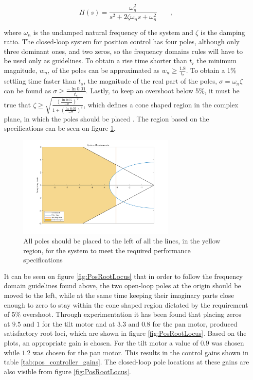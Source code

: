\documentclass[../../main.tex]{subfiles}
\begin{document}
\begin{equation} \label{eq:basic_second_order_tf}
    H(s) = \frac{\omega_n^2}{s^2 + 2\zeta \omega_n s + \omega_n^2} \qquad ,
\end{equation}

where $\omega_{n}$ is the undamped natural frequency of the system and $\zeta$ is the damping ratio. 
The closed-loop system for position control has four poles, although only three dominant ones, and two zeros, so the frequency domains rules will have to be used only as guidelines. To obtain a rise time shorter than $t_r$ the minimum magnitude, $w_n$, of the poles can be approximated as $w_n\geq\frac{1.8}{t_r}$. To obtain a 1\% settling time faster than $t_s$, the magnitude of the real part of the poles, $\sigma = \omega_n \zeta$ can be found as $\sigma \geq \frac{-\ln{0.01}}{t_s} $. Lastly, to keep an overshoot below 5\%, it must be true that $\zeta \geq \sqrt{\frac{(\frac{\ln{0.05}}{-\pi})^2}{1+(\frac{\ln{0.05}}{-\pi})^2}}$, which defines a cone shaped region in the complex plane, in which the poles should be placed \cite{}. The region based on the specifications can be seen on figure \ref{fig:system_requirements}.


\begin{figure}
    \centering
    \includegraphics[width=0.7\textwidth]{Sections/System_Design/Images/system_requirements_new.png}
    \caption{All poles should be placed to the left of all the lines, in the yellow region, for the system to meet the required performance specifications}
    \label{fig:system_requirements}
\end{figure}

It can be seen on figure \ref{fig:PosRootLocus} that in order to follow the frequency domain guidelines found above, the two open-loop poles at the origin should be moved to the left, while at the same time keeping their imaginary parts close enough to zero to stay within the cone shaped region dictated by the requirement of 5\% overshoot.
Through experimentation it has been found that placing zeros at $9.5$ and $1$ for the tilt motor and at $3.3$ and $0.8$ for the pan motor, produced satisfactory root loci, which are shown in figure \ref{fig:PosRootLocus}. Based on the plots, an appropriate gain is chosen. For the tilt motor a value of $0.9$ was chosen while $1.2$ was chosen for the pan motor. This results in the control gains shown in table \ref{tab:pos_controller_gains}. The closed-loop pole locations at these gains are also visible from figure \ref{fig:PosRootLocus}.
\end{document}
